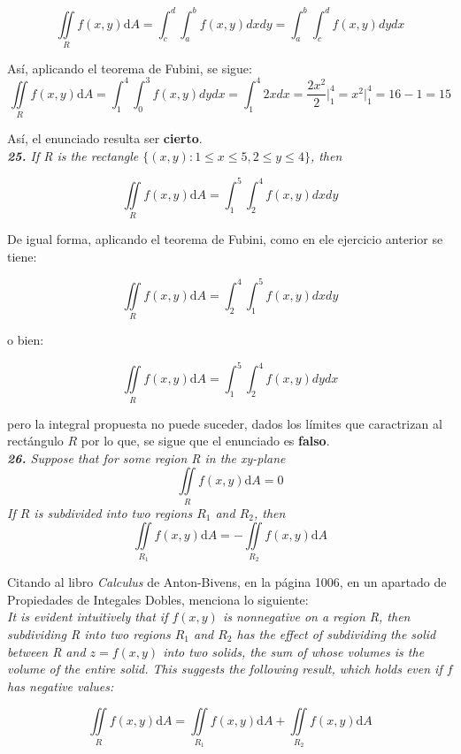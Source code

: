 \documentclass[a4paper,12pt]{article}
\begin{document}
		$$ \iint\limits_{R} f(x,y)\mathrm{d}A = \int_{c}^{d} \int_{a}^{b} f(x,y) dx dy
			= \int_{a}^{b} \int_{c}^{d} f(x,y) dy dx  $$

	Así, aplicando el teorema de Fubini, se sigue:
		$$ \iint\limits_{R} f(x,y)\mathrm{d}A = \int_{1}^{4} \int_{0}^{3} f(x,y) dy dx
		 	= \int_{1}^{4} 2x dx = \frac{2x^2}{2} \Big|_1^4 = x^2 \Big|_1^4 = 16 - 1 = 15 $$

		Así, el enunciado resulta ser \textbf{cierto}.\\

	\textit{\textbf{25.} If R is the rectangle $ \{(x,y):1 \leq x \leq 5,2 \leq y \leq 4\} $,
			then}

		$$ \iint\limits_{R} f(x,y)\mathrm{d}A = \int_{1}^{5} \int_{2}^{4} f(x,y) dx dy $$

	De igual forma, aplicando el teorema de Fubini, como en ele ejercicio anterior se tiene:

		$$ \iint\limits_{R} f(x,y)\mathrm{d}A = \int_{2}^{4} \int_{1}^{5} f(x,y) dx dy $$

			o bien:

		$$ \iint\limits_{R} f(x,y)\mathrm{d}A = \int_{1}^{5} \int_{2}^{4} f(x,y) dy dx $$

	pero la integral propuesta no puede suceder, dados los límites que caractrizan
	al rectángulo $R$ por lo que, se sigue que el enunciado es \textbf{falso}.\\

	\textit{\textbf{26.} Suppose that for some region R in the xy-plane}
			$$ \iint\limits_{R} f(x,y)\mathrm{d}A = 0 $$
	\textit{ If $R$ is subdivided into two regions $R_1$ and $R_2$, then }
			$$ \iint\limits_{R_1} f(x,y)\mathrm{d}A = - \iint\limits_{R_2} f(x,y)\mathrm{d}A  $$

	Citando al libro \textit{Calculus} de Anton-Bivens, en la página 1006, en un
	apartado de Propiedades de Integales Dobles, menciona lo siguiente:\\

	\textit{It is evident intuitively that if $f(x, y)$ is nonnegative on a
	region R, then subdividing R into two regions $R_1$ and $R_2$ has the effect
	of subdividing the solid between R and $z = f (x , y)$ into two solids,
	the sum of whose volumes is the volume of the entire solid. This suggests
	the following result, which holds even if $f$ has negative values:}

		$$ \iint\limits_{R} f(x,y)\mathrm{d}A
			= \iint\limits_{R_1} f(x,y)\mathrm{d}A + \iint\limits_{R_2} f(x,y)\mathrm{d}A  $$
\end{document}
